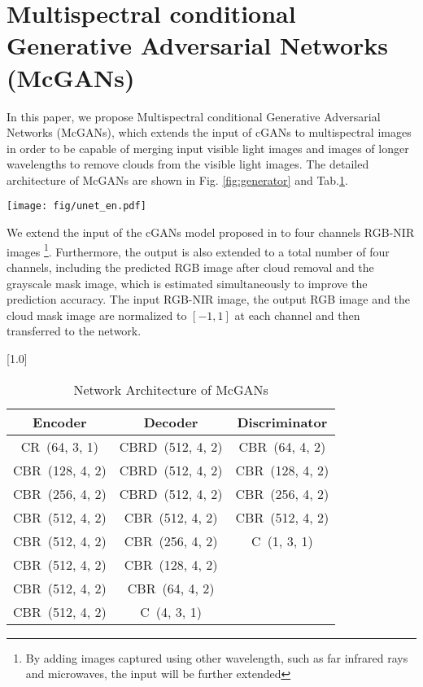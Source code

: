 \documentclass[10pt,twocolumn,letterpaper]{article}
\begin{document}
\section{Multispectral conditional Generative Adversarial Networks (McGANs)}
In this paper, we propose Multispectral conditional Generative Adversarial Networks (McGANs), which extends the input of cGANs to multispectral images in order to be capable of merging input visible light images and images of longer wavelengths to remove clouds from the visible light images. The detailed architecture of McGANs are shown in Fig. \ref{fig:generator} and Tab.\ref{tab:CNN_Structure}.

\begin{figure*}[htpb]
\begin{center}
\hspace*{0mm}\texttt{[image: fig/unet\_en.pdf]}
\caption{Network Architecture of Generator}
\label{fig:generator}
\end{center}
\end{figure*}

We extend the input of the cGANs model proposed in \cite{isola2016image} to four channels RGB-NIR images \footnote{By adding images captured using other wavelength, such as far infrared rays and microwaves, the input will be further extended}. Furthermore, the output is also extended to a total number of four channels, including the predicted RGB image after cloud removal and the grayscale mask image, which is estimated simultaneously to improve the prediction accuracy.
The input RGB-NIR image, the output RGB image and the cloud mask image are normalized to $[-1, 1]$ at each channel and then transferred to the network.

\begin{table}[tb]
\begin{center}
\caption{Network Architecture of McGANs\label{tab:CNN_Structure}}{
\scalebox{1.0}[1.0]{
\begin{tabular}{c|c|c}
\hline
Encoder & Decoder & Discriminator\\ \hline
CR~(64, 3, 1)  & CBRD~(512, 4, 2) & CBR~(64, 4, 2) \\
CBR~(128, 4, 2) & CBRD~(512, 4, 2) & CBR~(128, 4, 2)\\ 
CBR~(256, 4, 2) & CBRD~(512, 4, 2) & CBR~(256, 4, 2)\\ 
CBR~(512, 4, 2) & CBR~(512, 4, 2) & CBR~(512, 4, 2)\\
CBR~(512, 4, 2) & CBR~(256, 4, 2) & C~(1, 3, 1)\\
CBR~(512, 4, 2) & CBR~(128, 4, 2) & \\
CBR~(512, 4, 2) & CBR~(64, 4, 2) & \\
CBR~(512, 4, 2) & C~(4, 3, 1) & \\ \hline
\end{tabular} 
}
}
\end{center}
\end{table}
\end{document}
